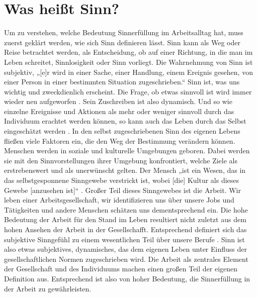 \chapter{Was heißt Sinn?}
Um zu verstehen, welche Bedeutung Sinnerfüllung im Arbeitsalltag hat, muss zuerst geklärt werden, wie sich Sinn definieren lässt. Sinn kann als Weg oder Reise betrachtet werden, als Entscheidung, ob auf einer Richtung, in die man im Leben schreitet, Sinnlosigkeit oder Sinn vorliegt. Die Wahrnehmung von Sinn ist subjektiv, „[e]r wird in einer Sache, einer Handlung, einem Ereignis gesehen, von einer Person in einer bestimmten Situation zugeschrieben.“
Sinn ist, was uns wichtig und zweckdienlich erscheint. Die Frage, ob etwas sinnvoll ist wird immer wieder neu aufgeworfen \cite[S.47-48]{Ehresmann.2018}. Sein Zuschreiben ist also dynamisch. Und so wie einzelne Ereignisse und Aktionen als mehr oder weniger sinnvoll durch das Individuum erachtet werden können, so kann auch das Leben durch das Selbst eingeschätzt werden \cite[S.12]{Schnell.2018}.
In den selbst zugeschriebenen Sinn des eigenen Lebens fließen viele Faktoren ein, die den Weg der Bestimmung verändern können. Menschen werden in soziale und kulturelle Umgebungen geboren. Dabei werden sie mit den Sinnvorstellungen ihrer Umgebung konfrontiert, welche Ziele als erstrebenswert und als unerwünscht gelten. Der Mensch „ist ein Wesen, das in das selbstgesponnene Sinngewebe verstrickt ist, wobei [die] Kultur als dieses Gewebe [anzusehen ist]“ \cite[S.47-48]{Ehresmann.2018}. Großer Teil dieses Sinngewebes ist die Arbeit. Wir leben einer Arbeitsgesellschaft, wir identifizieren uns über unsere Jobs und Tätigkeiten und andere Menschen schätzen uns dementsprechend ein. Die hohe Bedeutung der Arbeit für den Stand im Leben resultiert nicht zuletzt aus dem hohen Ansehen der Arbeit in der Gesellschafft. Entsprechend definiert sich das subjektive Sinngefühl zu einem wesentlichen Teil über unsere Berufe \cite[S.47-48]{Ehresmann.2018}.
Sinn ist also etwas subjektives, dynamisches, das dem eigenen Leben unter Einfluss der gesellschaftlichen Normen zugeschrieben wird. Die Arbeit als zentrales Element der Gesellschaft und des Individuums machen einen großen Teil der eigenen Definition aus. Entsprechend ist also von hoher Bedeutung, die Sinnerfüllung in der Arbeit zu gewährleisten. 
